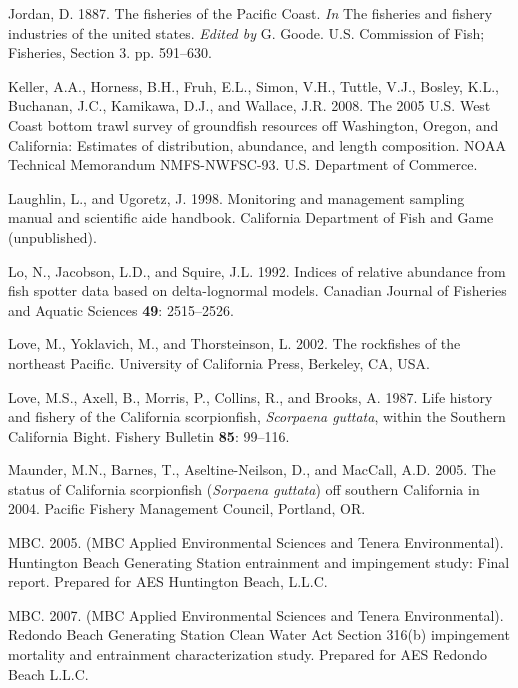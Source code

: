 \documentclass[12pt,]{article}
\begin{document}
\hypertarget{ref-Jordan1887}{}
Jordan, D. 1887. The fisheries of the Pacific Coast. \emph{In} The
fisheries and fishery industries of the united states. \emph{Edited by}
G. Goode. U.S. Commission of Fish; Fisheries, Section 3. pp. 591--630.

\hypertarget{ref-Keller2008}{}
Keller, A.A., Horness, B.H., Fruh, E.L., Simon, V.H., Tuttle, V.J.,
Bosley, K.L., Buchanan, J.C., Kamikawa, D.J., and Wallace, J.R. 2008.
The 2005 U.S. West Coast bottom trawl survey of groundfish resources off
Washington, Oregon, and California: Estimates of distribution,
abundance, and length composition. NOAA Technical Memorandum
NMFS-NWFSC-93. U.S. Department of Commerce.

\hypertarget{ref-Laughlin1998}{}
Laughlin, L., and Ugoretz, J. 1998. Monitoring and management sampling
manual and scientific aide handbook. California Department of Fish and
Game (unpublished).

\hypertarget{ref-Lo1992}{}
Lo, N., Jacobson, L.D., and Squire, J.L. 1992. Indices of relative
abundance from fish spotter data based on delta-lognormal models.
Canadian Journal of Fisheries and Aquatic Sciences \textbf{49}:
2515--2526.

\hypertarget{ref-Love2002}{}
Love, M., Yoklavich, M., and Thorsteinson, L. 2002. The rockfishes of
the northeast Pacific. University of California Press, Berkeley, CA,
USA.

\hypertarget{ref-Love1987}{}
Love, M.S., Axell, B., Morris, P., Collins, R., and Brooks, A. 1987.
Life history and fishery of the California scorpionfish, \emph{Scorpaena
guttata}, within the Southern California Bight. Fishery Bulletin
\textbf{85}: 99--116.

\hypertarget{ref-Maunder2005}{}
Maunder, M.N., Barnes, T., Aseltine-Neilson, D., and MacCall, A.D. 2005.
The status of California scorpionfish (\emph{Sorpaena guttata}) off
southern California in 2004. Pacific Fishery Management Council,
Portland, OR.

\hypertarget{ref-MBC2005}{}
MBC. 2005. (MBC Applied Environmental Sciences and Tenera
Environmental). Huntington Beach Generating Station entrainment and
impingement study: Final report. Prepared for AES Huntington Beach,
L.L.C.

\hypertarget{ref-MBC2007}{}
MBC. 2007. (MBC Applied Environmental Sciences and Tenera
Environmental). Redondo Beach Generating Station Clean Water Act Section
316(b) impingement mortality and entrainment characterization study.
Prepared for AES Redondo Beach L.L.C.
\end{document}
